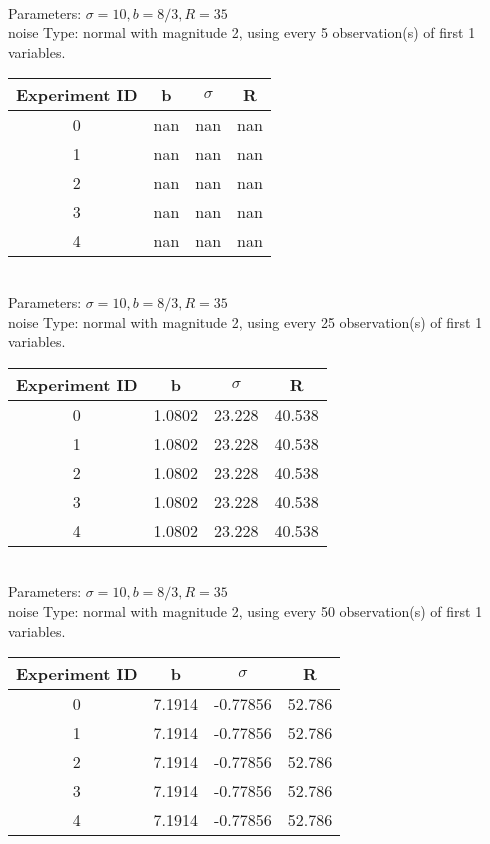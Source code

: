 \begin{multicols}{3}
\begin{tabular}{cccc}
 \end{tabular}\\
Parameters: $\sigma=10, b=8/3, R=35$\\
noise Type: normal with magnitude 2, using every 5 observation(s) of first 1 variables.\\
\begin{tabular}{cccc}
\hline Experiment ID & b & $\sigma$ & R \\ \hline 
0 & nan & nan & nan\\ \hline 
 1 & nan & nan & nan\\ \hline 
 2 & nan & nan & nan\\ \hline 
 3 & nan & nan & nan\\ \hline 
 4 & nan & nan & nan\\ \hline 
 \end{tabular}\\
Parameters: $\sigma=10, b=8/3, R=35$\\
noise Type: normal with magnitude 2, using every 25 observation(s) of first 1 variables.\\
\begin{tabular}{cccc}
\hline Experiment ID & b & $\sigma$ & R \\ \hline 
0 & 1.0802 & 23.228 & 40.538\\ \hline 
 1 & 1.0802 & 23.228 & 40.538\\ \hline 
 2 & 1.0802 & 23.228 & 40.538\\ \hline 
 3 & 1.0802 & 23.228 & 40.538\\ \hline 
 4 & 1.0802 & 23.228 & 40.538\\ \hline 
 \end{tabular}\\
Parameters: $\sigma=10, b=8/3, R=35$\\
noise Type: normal with magnitude 2, using every 50 observation(s) of first 1 variables.\\
\begin{tabular}{cccc}
\hline Experiment ID & b & $\sigma$ & R \\ \hline 
0 & 7.1914 & -0.77856 & 52.786\\ \hline 
 1 & 7.1914 & -0.77856 & 52.786\\ \hline 
 2 & 7.1914 & -0.77856 & 52.786\\ \hline 
 3 & 7.1914 & -0.77856 & 52.786\\ \hline 
 4 & 7.1914 & -0.77856 & 52.786\\ \hline 
 \end{tabular}\\

\end{multicols}

